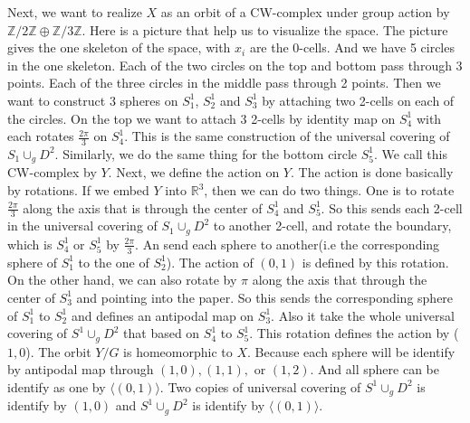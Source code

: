 \documentclass[12pt]{amsart}
\newcommand{\R}{\mathbb{R}}
\newcommand{\Z}{\mathbb{Z}}
\begin{document}
Next, we want to realize $X$ as an orbit of a CW-complex under group action by $\Z/2\Z\oplus \Z/3\Z$. Here is a picture that help us to visualize the space. The picture gives the one skeleton of the space, with $x_i$ are the 0-cells. And we have 5 circles in the one skeleton. Each of the two circles on the top and bottom pass through 3 points. Each of the three circles in the middle pass through 2 points. Then we want to construct 3 spheres on $S^1_1$, $S^1_2$ and $S^1_3$ by  attaching two 2-cells on each of the circles. On the top we want to attach 3 2-cells by identity map on $S^1_4$ with each rotates $\frac{2\pi}{3}$ on $S^1_4$. This is the same construction of the universal covering of $S_1\cup_g D^2$. Similarly, we do the same thing for the bottom circle $S^1_5$. We call this CW-complex by $Y$. Next, we define the action on $Y$. The action is done basically by rotations. If we embed $Y$ into $\R^3$, then we can do two things. One is to rotate $\frac{2\pi}{3}$ along the axis that is through the center of $S^1_4$ and $S^1_5$. So this sends each 2-cell in the universal covering of $S_1\cup_g D^2$ to another 2-cell, and rotate the boundary, which is $S^1_4$ or $S^1_5$ by $\frac{2\pi}{3}$. An send each sphere to another(i.e the corresponding sphere of $S^1_1$ to the one of $S^1_2$). The action of $(0,1)$ is defined by this rotation. On the other hand, we can also rotate by $\pi$ along the axis that through the center of $S^1_3$ and pointing into the paper. So this sends the corresponding sphere of $S^1_1$ to $S^1_2$ and defines an antipodal map on $S^1_3$. Also it take the whole universal covering of $S^1\cup_g D^2$ that based on $S^1_4$ to $S^1_5$. This rotation defines the action by ($1,0$). The orbit $Y/G$ is homeomorphic to $X$. Because each sphere will be identify by antipodal map through $(1,0),(1,1),$ or $(1,2)$. And all sphere can be identify as one by $\langle (0,1)\rangle$. Two copies of universal covering of $S^1\cup_g D^2$ is identify by $(1,0)$ and $S^1\cup_g D^2$ is identify by $\langle (0,1)\rangle$.\\
\end{document}
